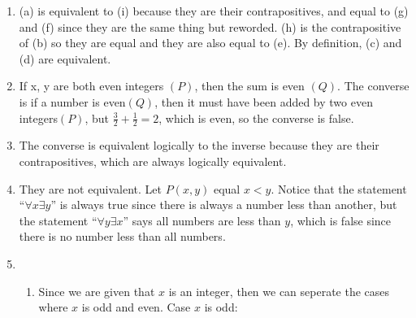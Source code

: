 \documentclass[12pt]{article}
\begin{document}
\begin{enumerate}
    \item (a) is equivalent to (i) because they are their contrapositives, and
          equal to (g) and (f) since they are the same thing but reworded.
           (h) is the contrapositive of (b) so they are equal and
          they are also equal to (e). By definition, (c) and (d) are
          equivalent.

    \item If x, y are both even integers $(P)$, then the sum is even $(Q)$. The converse
          is if a number is even$(Q)$, then it must have been added by two even
          integers$(P)$, but $\frac{3}{2} + \frac{1}{2} = 2$, which is even, so the
          converse is false.

    \item The converse is equivalent logically to the inverse because they are their
    contrapositives, which are always logically equivalent.

    \item They are not equivalent. Let $P(x,y)$ equal $x < y$. Notice that the statement
          ``$\forall x \exists y$'' is always true since there is always a number less
          than another, but the statement ``$\forall y \exists x$'' says all numbers are
          less than $y$, which is false since there is no number less than all numbers.

    \item
          \begin{enumerate}
              \item Since we are given that $x$ is an integer, then we can seperate the cases where
                    $x$ is odd and even. \newline Case $x$ is odd:


\end{enumerate}
\end{enumerate}
\end{document}

